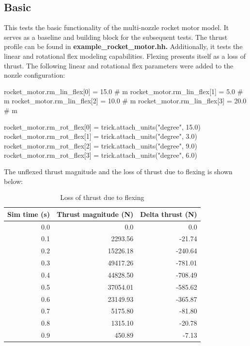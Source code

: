 \documentclass[11pt,fleqn]{report}
\begin{document}
\subsection{Basic}\label{sec:MultiNoz1}
This tests the basic functionality of the multi-nozzle rocket motor model.  It serves as a baseline and building block for the subsequent tests.  The thrust profile can be found in \textbf{example\_rocket\_motor.hh.}  Additionally, it tests the linear and rotational flex modeling capabilities.
Flexing presents itself as a loss of thrust.  The following linear and rotational flex parameters were added to the nozzle configuration:
\begin{code}
rocket_motor.rm_lin_flex[0] = 15.0 # m
rocket_motor.rm_lin_flex[1] =  5.0 # m
rocket_motor.rm_lin_flex[2] = 10.0 # m
rocket_motor.rm_lin_flex[3] = 20.0 # m

rocket_motor.rm_rot_flex[0] = trick.attach_units("degree", 15.0)
rocket_motor.rm_rot_flex[1] = trick.attach_units("degree",  3.0)
rocket_motor.rm_rot_flex[2] = trick.attach_units("degree",  9.0)
rocket_motor.rm_rot_flex[3] = trick.attach_units("degree",  6.0)
\end{code}

The unflexed thrust magnitude and the loss of thrust due to flexing is shown below:
\begin{longtable}{|r|r|r|}
\caption{Loss of thrust due to flexing}\\
\hline
\textbf{Sim time (s)} & \textbf{Thrust magnitude (N)} & \textbf{Delta thrust (N)}\\
\hline
\endhead

0.0 & 0.0 & 0.0 \\ \hline
0.1 & 2293.56 & -21.74 \\ \hline
0.2 & 15226.18 & -240.64 \\ \hline
0.3 & 49417.26 & -781.01 \\ \hline
0.4 & 44828.50 & -708.49 \\ \hline
0.5 & 37054.01 & -585.62 \\ \hline
0.6 & 23149.93 & -365.87 \\ \hline
0.7 & 5175.80 & -81.80 \\ \hline
0.8 & 1315.10 & -20.78 \\ \hline
0.9 & 450.89 & -7.13 \\ \hline
\end{longtable}
\end{document}
